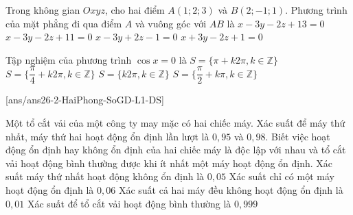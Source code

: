 \begin{ex}%
	Trong không gian $Oxyz$, cho hai điểm $A(1;2;3)$ và $B(2;-1;1)$. Phương trình của mặt phẳng đi qua điểm $A$ và vuông góc với $AB$ là
	\choice
	{$x-3y-2z+13=0$}
	{\True $x-3y-2z+11=0$}
	{$x-3y+2z-1=0$}
	{$x+3y-2z+1=0$}
\end{ex}

\begin{ex}%
	Tập nghiệm của phương trình $\cos x=0$ là
	\choice
	{$S=\{\pi+k2\pi,k\in\mathbb{Z}\}$}
	{$S=\{\dfrac{\pi}{4}+k2\pi,k\in\mathbb{Z}\}$}
	{$S=\{k2\pi,k\in\mathbb{Z}\}$}
	{\True $S=\{\dfrac{\pi}{2}+k\pi,k\in\mathbb{Z}\}$}
\end{ex}

\cauds
{}[ans/ans26-2-HaiPhong-SoGD-L1-DS]
\begin{ex}%
	Một tổ cắt vải của một công ty may mặc có hai chiếc máy. Xác suất để máy thứ nhất, máy thứ hai hoạt động ổn định lần lượt là $0{,}95$ và $0{,}98$. Biết việc hoạt động ổn định hay không ổn định của hai chiếc máy là độc lập với nhau và tổ cắt vải hoạt động bình thường được khi ít nhất một máy hoạt động ổn định.
	\choiceTF
	{\True Xác suất máy thứ nhất hoạt động không ổn định là $0{,}05$}
	{Xác suất chỉ có một máy hoạt động ổn định là $0{,}06$}
	{Xác suất cả hai máy đều không hoạt động ổn định là $0{,}01$}
	{\True Xác suất để tổ cắt vải hoạt động bình thường là $0{,}999$}
\end{ex}

